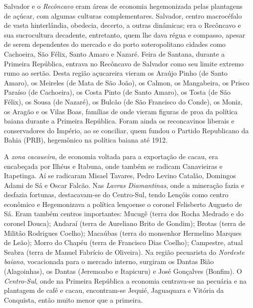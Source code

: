 Salvador e o \textit{Recôncavo} eram áreas de economia hegemonizada pelas plantagens de açúcar, com algumas culturas complementares. Salvador, centro macrocéfalo de vasta hinterlândia, obedecia, decerto, a outras dinâmicas; era o Recôncavo e sua sucrocultura decadente, entretanto, quem lhe dava régua e compasso, apesar de serem dependentes do mercado e do porto soteropolitano cidades como Cachoeira, São Félix, Santo Amaro e Nazaré. Feira de Santana, durante a Primeira República, entrava no Recôncavo de Salvador como seu limite extremo rumo ao sertão. Desta região açucareira vieram os Araújo Pinho (de Santo Amaro), os Meireles (de Mata de São João), os Calmon, os Mangabeira, os Prisco Paraíso (de Cachoeira), os Costa Pinto (de Santo Amaro), os Tosta (de São Félix), os Sousa (de Nazaré), os Bulcão (de São Francisco do Conde), os Moniz, os Aragão e os Vilas Boas, famílias de onde vieram figuras de proa da política baiana durante a Primeira República. Foram ainda os reconcavinos liberais e conservadores do Império, ao se conciliar, quem fundou o Partido Republicano da Bahia (PRB), hegemônico na política baiana até 1912.

A \textit{zona cacaueira}, de economia voltada para a exportação de cacau, era encabeçada por Ilhéus e Itabuna, onde também se radicam Canavieiras e Itapetinga. Aí se radicaram Misael Tavares, Pedro Levino Catalão, Domingos Adami de Sá e Oscar Falcão. Nas \textit{Lavras Diamantinas}, onde a mineração fazia e desfazia fortunas, destacavam-se do Centro-Sul, tendo Lençóis como centro econômico e Hegemonizava a política lençoense o coronel Felisberto Augusto de Sá. Eram também centros importantes: Mucugê (terra dos Rocha Medrado e do coronel Douca); Andaraí (terra de Aureliano Brito de Gondim); Brotas (terra de Militâo Rodrigues Coelho); Macaúbas (terra do monsenhor Hermelino Marques de Leão); Morro do Chapéu (terra de Francisco Dias Coelho); Campestre, atual Seabra (terra de Manuel Fabrício de Oliveira). Na região pecuarista do \textit{Nordeste baiano}, vocacionada para o mercado interno,  surgiram os Dantas Bião (Alagoinhas), os Dantas (Jeremoabo e Itapicuru) e José Gonçalves (Bonfim). O \textit{Centro-Sul}, onde na Primeira República a economia centrava-se na pecuária e na plantagem de café e cacau, encontram-se Jequié, Jaguaquara e Vitória da Conquista, então muito menor que a primeira. 

